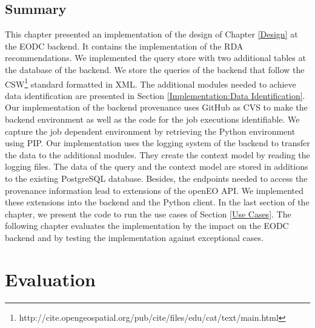 \documentclass[draft,final]{vutinfth} %
\begin{document}
\section{Summary}
This chapter presented an implementation of the design of Chapter \ref{Design} at the EODC backend. It contains the implementation of the RDA recommendations. We implemented the query store with two additional tables at the database of the backend. We store the queries of the backend that follow the CSW\footnote{http://cite.opengeospatial.org/pub/cite/files/edu/cat/text/main.html} standard formatted in XML. The additional modules needed to achieve data identification are presented in Section \ref{Implementation:Data Identification}. Our implementation of the backend provenance uses GitHub as CVS to make the backend environment as well as the code for the job executions identifiable. We capture the job dependent environment by retrieving the Python environment using PIP. Our implementation uses the logging system of the backend to transfer the data to the additional modules. They create the context model by reading the logging files. The data of the query and the context model are stored in additions to the existing PostgreSQL database. Besides, the endpoints needed to access the provenance information lead to extensions of the openEO API. We implemented these extensions into the backend and the Python client. In the last section of the chapter, we present the code to run the use cases of Section \ref{Use Cases}. The following chapter evaluates the implementation by the impact on the EODC backend and by testing the implementation against exceptional cases.   

\chapter{Evaluation}\label{Evaluation}


\end{document}
